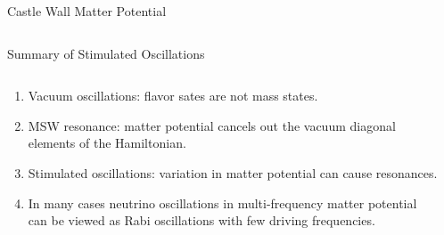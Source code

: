 \documentclass[9pt]{beamer}
\begin{document}
\begin{darkframes}
\begin{frame}{Castle Wall Matter Potential}
\begin{columns}[T]
\begin{column}{0.5\textwidth}

\end{column}
\end{columns}




\end{frame}



\begin{frame}{Summary of Stimulated Oscillations}


\begin{columns}[T]
\begin{column}{0.6\textwidth}

\begin{enumerate}[<+->]
\item
Vacuum oscillations: flavor sates are not mass states.
\item
MSW resonance: matter potential cancels out the vacuum diagonal elements of the Hamiltonian.
\item
Stimulated oscillations: variation in matter potential can cause resonances.

\item
In many cases neutrino oscillations in multi-frequency matter potential can be viewed as Rabi oscillations with few driving frequencies.
\end{enumerate}

\end{column}
\begin{column}{0.4\textwidth}


\end{column}
\end{columns}
\end{frame}
\end{darkframes}
\end{document}
